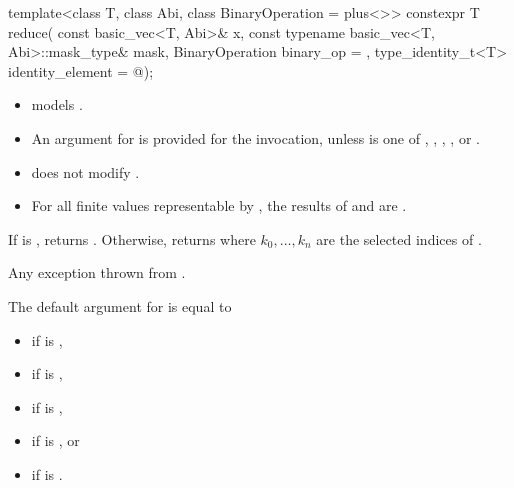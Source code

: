 \begin{itemdecl}
template<class T, class Abi, class BinaryOperation = plus<>>
  constexpr T reduce(
    const basic_vec<T, Abi>& x, const typename basic_vec<T, Abi>::mask_type& mask,
    BinaryOperation binary_op = {}, type_identity_t<T> identity_element = @\seebelow@);
\end{itemdecl}

\begin{itemdescr}
\pnum
\constraints
\begin{itemize}
\item
   models
  .
\item
  An argument for  is provided for the invocation,
  unless  is one of ,
  , , , or
  .
\end{itemize}

\pnum
\expects
\begin{itemize}
 \item
    does not modify .
 \item
   For all finite values  representable by , the results of
    and  are .
\end{itemize}

\pnum
\returns
If  is , returns .
Otherwise, returns  where $k_0, \ldots, k_n$ are
the selected indices of .

\pnum
\throws
Any exception thrown from .

\pnum
\remarks
The default argument for  is equal to
\begin{itemize}
\item {} if  is ,
\item {} if  is ,
\item {} if  is ,
\item {} if  is , or
\item {} if  is .
\end{itemize}
\end{itemdescr}

